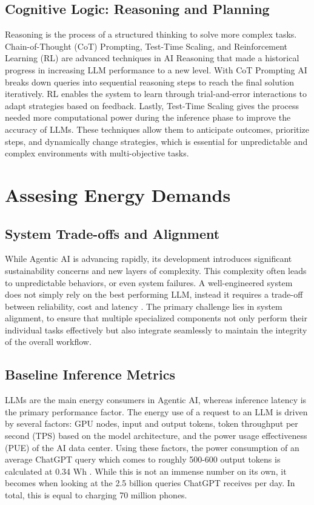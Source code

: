 \documentclass[10pt,twocolumn,letterpaper]{article}
\begin{document}
\subsection{Cognitive Logic: Reasoning and Planning}
\label{sec:background_reasoning}
Reasoning is the process of a structured thinking to solve more complex tasks. Chain-of-Thought (CoT) Prompting, Test-Time Scaling, and Reinforcement Learning (RL) are advanced techniques in AI Reasoning that made a historical progress in increasing LLM performance to a new level. With CoT Prompting AI breaks down queries into sequential reasoning steps to reach the final solution iteratively. RL enables the system to learn through trial-and-error interactions to adapt strategies based on feedback. Lastly, Test-Time Scaling gives the process needed more computational power during the inference phase to improve the accuracy of LLMs. These techniques allow them to anticipate outcomes, prioritize steps, and dynamically change strategies, which is essential for unpredictable and complex environments with multi-objective tasks.






\section{Assesing Energy Demands}

\subsection{System Trade-offs and Alignment}
While Agentic AI is advancing rapidly, its development introduces significant sustainability concerns and new layers of complexity. This complexity often leads to unpredictable behaviors, or even system failures. A well-engineered system does not simply rely on the best performing LLM, instead it requires a trade-off between reliability, cost and latency \citep{Xu_2026}. The primary challenge lies in system alignment, to ensure that multiple specialized components not only perform their individual tasks effectively but also integrate seamlessly to maintain the integrity of the overall workflow.

\subsection{Baseline Inference Metrics}
LLMs are the main energy consumers in Agentic AI, whereas inference latency is the primary performance factor. The energy use of a request to an LLM is driven by several factors: GPU nodes, input and output tokens, token throughput per second (TPS) based on the model architecture, and the power usage effectiveness (PUE) of the AI data center. Using these factors, the power consumption of an average ChatGPT query which comes to roughly 500-600 output tokens is calculated at 0.34 Wh \citep{Oviedo_Kazhamiaka_Choukse_Kim_Luers_Nakagawa_Bianchini_Ferres_2025}. While this is not an immense number on its own, it becomes when looking at the 2.5 billion queries ChatGPT receives per day. In total, this is equal to charging 70 million phones.
\end{document}
